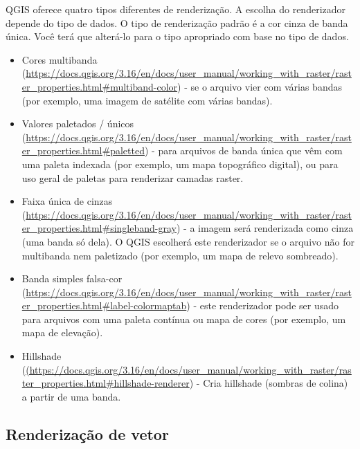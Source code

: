 \documentclass[
]{krantz}
\providecommand{\tightlist}{%
  \setlength{\itemsep}{0pt}\setlength{\parskip}{0pt}}
\begin{document}
QGIS oferece quatro tipos diferentes de renderização. A escolha do renderizador depende do tipo de dados. O tipo de renderização padrão é a cor cinza de banda única. Você terá que alterá-lo para o tipo apropriado com base no tipo de dados.

\begin{itemize}
\tightlist
\item
  Cores multibanda (\url{https://docs.qgis.org/3.16/en/docs/user_manual/working_with_raster/raster_properties.html\#multiband-color}) - se o arquivo vier com várias bandas (por exemplo, uma imagem de satélite com várias bandas).
\item
  Valores paletados / únicos (\href{}{https://docs.qgis.org/3.16/en/docs/user\_manual/working\_with\_raster/raster\_properties.html\#paletted}) - para arquivos de banda única que vêm com uma paleta indexada (por exemplo, um mapa topográfico digital), ou para uso geral de paletas para renderizar camadas raster.
\item
  Faixa única de cinzas (\href{https://docs.qgis.org/3.16/en/docs/\%20user_manual\%20/\%20working_with_raster\%20/\%20raster_properties.html\%20\#\%20singleband-grey}{https://docs.qgis.org/3.16/en/docs/user\_manual/working\_with\_raster/raster\_properties.html\#singleband-gray}) - a imagem será renderizada como cinza (uma banda só dela). O QGIS escolherá este renderizador se o arquivo não for multibanda nem paletizado (por exemplo, um mapa de relevo sombreado).
\item
  Banda simples falsa-cor (\href{https://docs.qgis.org/3.16/en/docs/\%20user_manual\%20/\%20working_with_raster\%20/\%20raster_properties.html\%20\#\%20label-colormaptab}{https://docs.qgis.org/3.16/en/docs/user\_manual/working\_with\_raster/raster\_properties.html\#label-colormaptab}) - este renderizador pode ser usado para arquivos com uma paleta contínua ou mapa de cores (por exemplo, um mapa de elevação).
\item
  Hillshade (\href{https://docs.qgis.org/3.16/en/docs/\%20user_manual\%20/\%20working_with_raster\%20/\%20raster_properties.html\%20\#\%20hillshade-renderer}{(https://docs.qgis.org/3.16/en/docs/user\_manual/working\_with\_raster/raster\_properties.html\#hillshade-renderer}) - Cria hillshade (sombras de colina) a partir de uma banda.
\end{itemize}

\hypertarget{renderizauxe7uxe3o-de-vetor}{%
\subsection{Renderização de vetor}\label{renderizauxe7uxe3o-de-vetor}}
\end{document}
